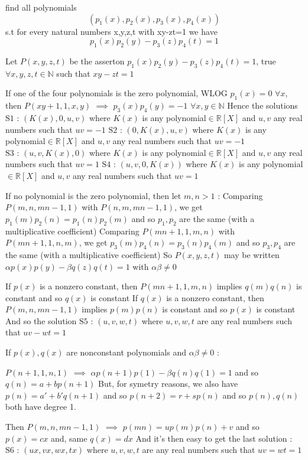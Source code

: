 \begin{solution}
	\begin{tcolorbox}find all polynomials \[(p_{1}(x),p_{2}(x),p_{3}(x),p_{4}(x))\] s.t for every natural numbers x,y,z,t with xy-zt=1 we have  \[p_{1}(x)p_{2}(y)-p_{3}(z)p_{4}(t)=1\]\end{tcolorbox}
Let $P(x,y,z,t)$ be the asserton $p_1(x)p_2(y)-p_3(z)p_4(t)=1$, true $\forall x,y,z,t\in\mathbb N$ such that $xy-zt=1$

If one of the four polynomials is the zero polynomial, WLOG $p_1(x)=0$ $\forall x$, then $P(xy+1,1,x,y)$ $\implies$ $p_3(x)p_4(y)=-1$ $\forall x,y\in\mathbb N$
Hence the solutions
$\boxed{\text{S1 : }(K(x),0,u,v)}$ where $K(x)$ is any polynomial$\in\mathbb R[X]$ and $u,v$ any real numbers such that $uv=-1$
$\boxed{\text{S2 : }(0,K(x),u,v)}$ where $K(x)$ is any polynomial$\in\mathbb R[X]$ and $u,v$ any real numbers such that $uv=-1$
$\boxed{\text{S3 : }(u,v,K(x),0)}$ where $K(x)$ is any polynomial$\in\mathbb R[X]$ and $u,v$ any real numbers such that $uv=1$
$\boxed{\text{S4 : }(u,v,0,K(x))}$ where $K(x)$ is any polynomial$\in\mathbb R[X]$ and $u,v$ any real numbers such that $uv=1$

If no polynomial is the zero polynomial, then let $m,n>1$ :
Comparing $P(m,n,mn-1,1)$ with $P(n,m,mn-1,1)$, we get $p_1(m)p_2(n)=p_1(n)p_2(m)$ and so $p_1,p_2$ are the same (with a multiplicative coefficient)
Comparing $P(mn+1,1,m,n)$ with $P(mn+1,1,n,m)$, we get $p_3(m)p_4(n)=p_3(n)p_4(m)$ and so $p_3,p_4$ are the same (with a multiplicative coefficient)
So $P(x,y,z,t)$ may be written $\alpha p(x)p(y)-\beta q(z)q(t)=1$ with $\alpha\beta\ne 0$

If $p(x)$ is a nonzero constant, then $P(mn+1,1,m,n)$ implies $q(m)q(n)$ is constant and so $q(x)$ is constant
If $q(x)$ is a nonzero constant, then $P(m,n,mn-1,1)$ implies $p(m)p(n)$ is constant and so $p(x)$ is constant
And so the solution $\boxed{\text{S5 : }(u,v,w,t)}$ where  $u,v,w,t$ are any real numbers such that $uv-wt=1$

If $p(x),q(x)$ are nonconstant polynomials and $\alpha\beta\ne 0$ :

$P(n+1,1,n,1)$ $\implies$ $\alpha p(n+1)p(1)-\beta q(n)q(1)=1$ and so $q(n)=a + b p(n+1)$
But, for symetry reasons, we also have $p(n)=a'+b'q(n+1)$ and so $p(n+2)=r+sp(n)$ and so $p(n),q(n)$ both have degree 1.

Then $P(m,n,mn-1,1)$ $\implies$ $p(mn)=u p(m)p(n)+v$ and so $p(x)=c x$ and, same $q(x)=d x$
And it's then easy to get the last solution :
$\boxed{\text{S6 : }(ux,vx,wx,tx)}$ where  $u,v,w,t$ are any real numbers such that $uv=wt=1$
\end{solution}



